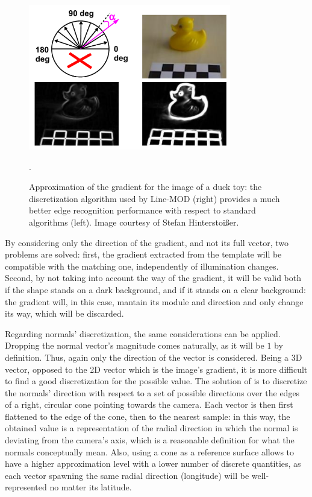 \begin{figure}[htbp]
\centering
\includegraphics[height=2.5in]{./Graphics/duck-gradient}
\caption{Approximation of the gradient for the image of a duck toy:
  the discretization algorithm used by Line-MOD (right) provides a
  much better edge recognition performance with respect to standard
  algorithms (left). Image courtesy of Stefan Hinterstoi\ss er. \label{fig:duck-gradient}}.
\end{figure}

By considering only the direction of the gradient, and not its
full vector, two problems are solved: first, the gradient extracted
from the template will be compatible with the matching one,
independently of illumination changes. Second, by not taking into
account the way of the gradient, it will be valid both if the shape
stands on a dark background, and if it stands on a clear background:
the gradient will, in this case, mantain its module and direction and
only change its way, which will be discarded.

Regarding normals' discretization, the same considerations can be
applied. Dropping the normal vector's magnitude comes naturally, as
it will be $1$ by definition. Thus, again only the direction of the vector is
considered. Being a 3D vector, opposed to the 2D vector which is the
image's gradient, it is more difficult to find a good discretization
for the possible value. The solution of \cite{linemod-paper} is to
discretize the normals' direction with respect to a set of possible
directions over the edges of a right, circular cone pointing towards
the camera. Each vector is then first flattened to the edge of the
cone, then to the nearest sample: in this way, the obtained value
is a representation of the radial direction in which the normal is deviating from the
camera's axis, which is a reasonable definition for what the normals
conceptually mean. Also, using a cone as a reference surface allows to
have a higher approximation level with a lower number of discrete
quantities, as each vector spawning the same radial direction
(longitude) will be well-represented no matter its latitude.

